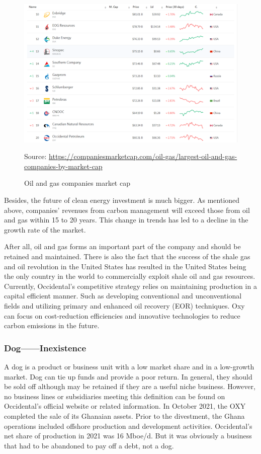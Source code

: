 \documentclass[
	a4paper, %
	12pt,%
]{CSSullivanBusinessReport}
\begin{document}
\begin{fullwidth}
\begin{figure}[h]
    \includegraphics{Images/Oil and gas companies market cap.png}
    \caption{Oil and gas companies market cap}
    Source: \url{https://companiesmarketcap.com/oil-gas/largest-oil-and-gas-companies-by-market-cap}
    \label{Oil and gas companies market cap}
   
\end{figure}
Besides, the future of clean energy investment is much bigger. As mentioned above, companies' revenues from carbon management will exceed those from oil and gas within 15 to 20 years. This change in trends has led to a decline in the growth rate of the market.
\par
After all, oil and gas forms an important part of the company and should be retained and maintained. There is also the fact that the success of the shale gas and oil revolution
in the United States has resulted in the United States being the only country in the world to commercially exploit shale oil and gas resources. Currently, Occidental’s competitive strategy relies on maintaining production in a capital efficient manner. Such as developing conventional and unconventional fields and utilizing primary and enhanced oil recovery (EOR) techniques. Oxy can focus on cost-reduction efficiencies and innovative technologies to reduce carbon emissions in the future.
\subsubsection{Dog——Inexistence}
A dog is a product or business unit with a low market share and in a low-growth market. Dog can tie up funds and provide a poor return. In general, they should be sold off although 	may be retained if they are a useful niche business. However, no business lines or subsidiaries meeting this definition can be found on Occidental's official website or related information. In October 2021, the OXY completed the sale of its Ghanaian assets. Prior to the divestment, the Ghana operations included offshore production and development activities. Occidental’s net share of production in 2021 was 16 Mboe/d. But it was obviously a business that had to be abandoned to pay off a debt, not a dog.

\end{fullwidth}
\end{document}
